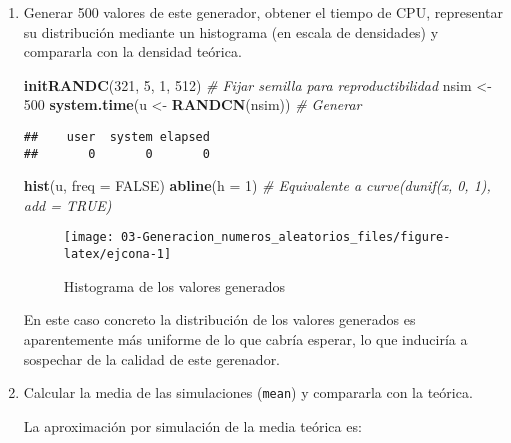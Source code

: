\documentclass[
]{book}
\newenvironment{Shaded}{\begin{snugshade}}{\end{snugshade}}
\newcommand{\CommentTok}[1]{\textcolor[rgb]{0.56,0.35,0.01}{\textit{#1}}}
\newcommand{\DataTypeTok}[1]{\textcolor[rgb]{0.13,0.29,0.53}{#1}}
\newcommand{\DecValTok}[1]{\textcolor[rgb]{0.00,0.00,0.81}{#1}}
\newcommand{\KeywordTok}[1]{\textcolor[rgb]{0.13,0.29,0.53}{\textbf{#1}}}
\newcommand{\NormalTok}[1]{#1}
\newcommand{\OtherTok}[1]{\textcolor[rgb]{0.56,0.35,0.01}{#1}}
\newcommand{\StringTok}[1]{\textcolor[rgb]{0.31,0.60,0.02}{#1}}
\theoremstyle{break}
\theoremstyle{definition}
\theoremstyle{definition}
\theoremstyle{definition}
\theoremstyle{remark}
\begin{document}
\begin{enumerate}
\def\labelenumi{\alph{enumi})}
\item
  Generar 500 valores de este generador, obtener el tiempo de CPU,
  representar su distribución mediante un histograma (en escala
  de densidades) y compararla con la densidad teórica.

\begin{Shaded}
\begin{Highlighting}[]
\KeywordTok{initRANDC}\NormalTok{(}\DecValTok{321}\NormalTok{, }\DecValTok{5}\NormalTok{, }\DecValTok{1}\NormalTok{, }\DecValTok{512}\NormalTok{)       }\CommentTok{# Fijar semilla para reproductibilidad}
\NormalTok{nsim <-}\StringTok{ }\DecValTok{500}
\KeywordTok{system.time}\NormalTok{(u <-}\StringTok{ }\KeywordTok{RANDCN}\NormalTok{(nsim))  }\CommentTok{# Generar}
\end{Highlighting}
\end{Shaded}

\begin{verbatim}
##    user  system elapsed 
##       0       0       0
\end{verbatim}

\begin{Shaded}
\begin{Highlighting}[]
\KeywordTok{hist}\NormalTok{(u, }\DataTypeTok{freq =} \OtherTok{FALSE}\NormalTok{)}
\KeywordTok{abline}\NormalTok{(}\DataTypeTok{h =} \DecValTok{1}\NormalTok{)                   }\CommentTok{# Equivalente a curve(dunif(x, 0, 1), add = TRUE)}
\end{Highlighting}
\end{Shaded}

  \begin{figure}[!htb]

  {\centering \texttt{[image: 03-Generacion\_numeros\_aleatorios\_files/figure-latex/ejcona-1]} 

  }

  \caption{Histograma de los valores generados}\label{fig:ejcona}
  \end{figure}

  En este caso concreto la distribución de los valores generados es aparentemente más uniforme de lo que cabría esperar, lo que induciría a sospechar de la calidad de este gerenador.
\item
  Calcular la media de las simulaciones (\texttt{mean}) y compararla con
  la teórica.

  La aproximación por simulación de la media teórica es:


\end{enumerate}
\end{document}
